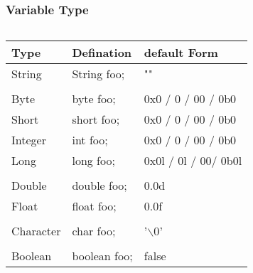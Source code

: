 \documentclass[
  11pt, %
  xcolor=dvipsnames
]{beamer}
\begin{document}
\begin{frame}[fragile]
	\frametitle{Variable Type}
	\begin{columns}[c]
		\begin{column}{0.9\textwidth}

			\begin{table}
				\begin{tabular}{l l l}
					\toprule
					Type      & Defination   & default Form         \\
					\midrule
					String    & String foo;  & ""                   \\
					          &              &                      \\
					Byte      & byte foo;    & 0x0 / 0 / 00 / 0b0   \\
					Short     & short foo;   & 0x0 / 0 / 00 / 0b0   \\
					Integer   & int foo;     & 0x0 / 0 / 00 / 0b0   \\
					Long      & long foo;    & 0x0l / 0l / 00/ 0b0l \\
					          &              &                      \\
					Double    & double foo;  & 0.0d                 \\
					Float     & float foo;   & 0.0f                 \\
					          &              &                      \\
					Character & char foo;    & '$\backslash0$'      \\
					          &              &                      \\
					Boolean   & boolean foo; & false                \\


\end{tabular}
\end{table}
\end{column}
\end{columns}
\end{frame}
\end{document}
